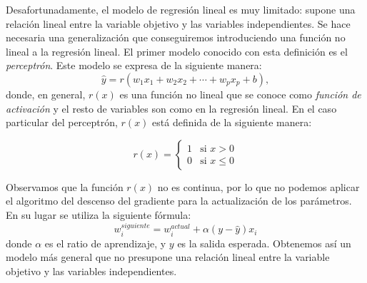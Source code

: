 \documentclass[12pt, a4paper, twoside]{book}
\numberwithin{equation}{section}
\theoremstyle{definition}
\theoremstyle{remark}
\theoremstyle{plain}
\begin{document}
	Desafortunadamente, el modelo de regresión lineal es muy limitado: 
	supone una relación lineal entre la variable objetivo y las variables
	independientes. Se hace necesaria una generalización que conseguiremos
	introduciendo una función no lineal a la regresión lineal. El primer
	modelo conocido con esta definición es el \emph{perceptrón}. Este 
	modelo se expresa de la siguiente manera:
	\begin{equation*}
		\hat{y}=r(w_{1}x_{1}+w_{2}x_{2}+\cdots+w_{p}x_{p}+b),
	\end{equation*}
	donde, en general, $r(x)$ es una función no lineal que se conoce como 
	\emph{función de activación} y el resto de variables son como en la 
	regresión lineal. En el caso particular del perceptrón, $r(x)$ está 
	definida de la siguiente manera:
	
	\begin{equation}
		\label{def:r}
		r(x)=\left \{
			\begin{array}{ll}
				1&\text{si }x>0\\
				0&\text{si }x\leq0
			\end{array} 
		     \right .
	\end{equation}

	Observamos que la función $r(x)$ no es continua, por lo que no 
	podemos aplicar el algoritmo del descenso del gradiente para la 
	actualización de los parámetros. En su lugar se utiliza la siguiente 
	fórmula:
	\begin{equation*}
		w_{i}^{siguiente}=w_{i}^{actual}+\alpha(y-\hat{y})x_{i}
	\end{equation*}
	donde $\alpha$ es el ratio de aprendizaje, y $y$ es la salida 
	esperada. Obtenemos así un modelo más general que no presupone una 
	relación lineal entre la variable objetivo y las variables 
	independientes. 
	
\end{document}
